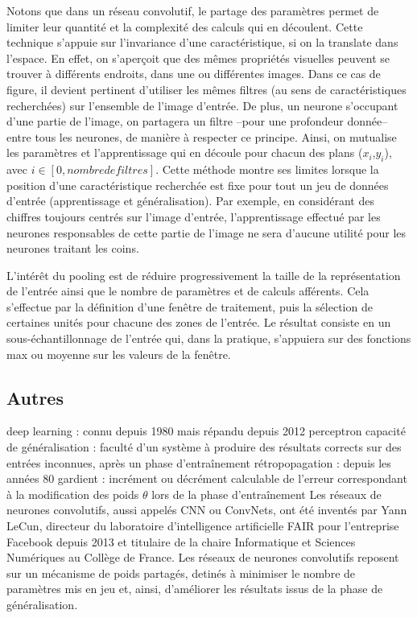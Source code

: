 \documentclass[12pt]{report}
\begin{document}
Notons que dans un réseau convolutif, le partage des paramètres permet de limiter leur quantité et la complexité des calculs qui en découlent.
Cette technique s’appuie sur l’invariance d’une caractéristique, si on la translate dans l’espace.
En effet, on s’aperçoit que des mêmes propriétés visuelles peuvent se trouver à différents endroits, dans une ou différentes images.
Dans ce cas de figure, il devient pertinent d’utiliser les mêmes filtres (au sens de caractéristiques recherchées) sur l’ensemble de l’image d’entrée.
De plus, un neurone s’occupant d’une partie de l’image, on partagera un filtre –pour une profondeur donnée– entre tous les neurones, de manière à respecter ce principe.
Ainsi, on mutualise les paramètres et l’apprentissage qui en découle pour chacun des plans ($x_{i}$,$y_{i}$), avec $i  \in [0, nombre de filtres]$.
Cette méthode montre ses limites lorsque la position d’une caractéristique recherchée est fixe pour tout un jeu de données d’entrée (apprentissage et généralisation).
Par exemple, en considérant des chiffres toujours centrés sur l’image d’entrée, l’apprentissage effectué par les neurones responsables de cette partie de l’image ne sera d’aucune utilité pour les neurones traitant les coins.
\par
L’intérêt du pooling est de réduire progressivement la taille de la représentation de l’entrée ainsi que le nombre de paramètres et de calculs afférents.
Cela s’effectue par la définition d’une fenêtre de traitement, puis la sélection de certaines unités pour chacune des zones de l’entrée.
Le résultat consiste en un sous-échantillonnage de l’entrée qui, dans la pratique, s’appuiera sur des fonctions max ou moyenne sur les valeurs de la fenêtre.

\subsection{Autres}
deep learning : connu depuis 1980 mais répandu depuis 2012
perceptron
capacité de généralisation : faculté d'un système à produire des résultats corrects sur des entrées inconnues, après un phase d'entraînement
rétropopagation : depuis les années 80
gardient : incrément ou décrément calculable de l'erreur correspondant à la modification des poids $\theta$ lors de la phase d'entraînement
Les réseaux de neurones convolutifs, aussi appelés \gls{CNN} ou ConvNets, ont été inventés par Yann LeCun, directeur du laboratoire d'intelligence artificielle FAIR pour
l'entreprise Facebook depuis 2013 et titulaire de la chaire Informatique et Sciences Numériques au Collège de France.
Les réseaux de neurones convolutifs reposent sur un mécanisme de poids partagés, detinés à minimiser le nombre de paramètres mis en jeu et, ainsi, d'améliorer les
résultats issus de la phase de généralisation.
\end{document}
